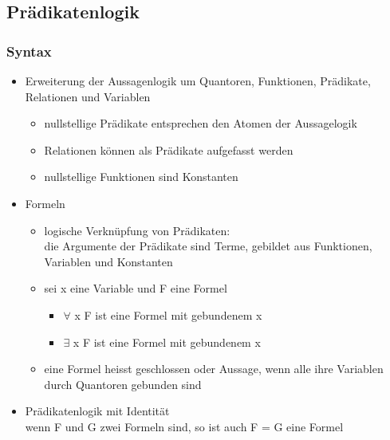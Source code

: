\documentclass[a4paper,10pt]{article}
\begin{document}
\subsection{Pr\"adikatenlogik}
\subsubsection{Syntax}
\begin{itemize}
	\item Erweiterung der Aussagenlogik um Quantoren, Funktionen, Pr\"adikate, Relationen und Variablen
		\begin{itemize}
			\item nullstellige Pr\"adikate entsprechen den Atomen der Aussagelogik
			\item Relationen k\"onnen als Pr\"adikate aufgefasst werden
			\item nullstellige Funktionen sind Konstanten
		\end{itemize}
	\item Formeln
		\begin{itemize}
			\item logische Verkn\"upfung von Pr\"adikaten: \\
				die Argumente der Pr\"adikate sind Terme, gebildet aus Funktionen, Variablen und Konstanten
			\item sei x eine Variable und F eine Formel
				\begin{itemize}
					\item $\forall$ x F ist eine Formel mit gebundenem x
					\item $\exists$ x F ist eine Formel mit gebundenem x
				\end{itemize}
			\item eine Formel heisst geschlossen oder Aussage, wenn alle ihre Variablen durch Quantoren gebunden sind
		\end{itemize}
	\item Pr\"adikatenlogik mit Identit\"at \\
		wenn F und G zwei Formeln sind, so ist auch F = G eine Formel
\end{itemize}
\end{document}
